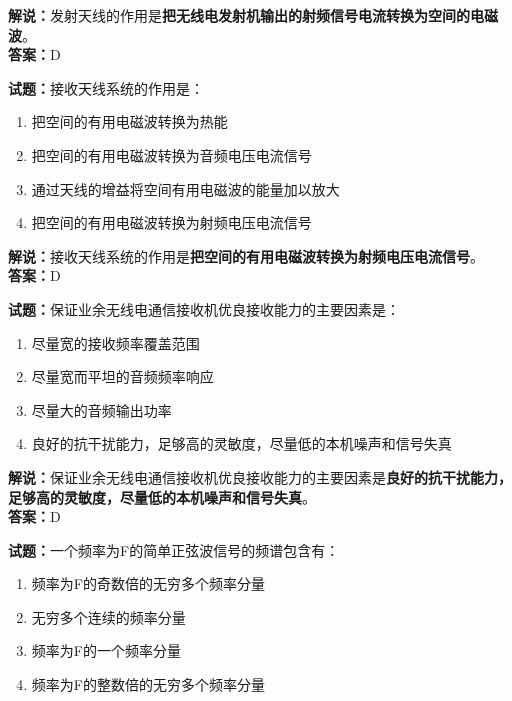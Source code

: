 \documentclass{ctexbook}
\begin{document}
\noindent\textbf{解说：}发射天线的作用是\textbf{把无线电发射机输出的射频信号电流转换为空间的电磁波}。\\
\noindent\textbf{答案：}D


\bigskip


\noindent\textbf{试题：}接收天线系统的作用是：

\begin{enumerate}[leftmargin=3em]
	\item 把空间的有用电磁波转换为热能
	\item 把空间的有用电磁波转换为音频电压电流信号
	\item 通过天线的增益将空间有用电磁波的能量加以放大
	\item 把空间的有用电磁波转换为射频电压电流信号
\end{enumerate}

\noindent\textbf{解说：}接收天线系统的作用是\textbf{把空间的有用电磁波转换为射频电压电流信号}。\\\noindent\textbf{答案：}D%


\bigskip


\noindent\textbf{试题：}保证业余无线电通信接收机优良接收能力的主要因素是：

\begin{enumerate}[leftmargin=3em]
	\item 尽量宽的接收频率覆盖范围
	\item 尽量宽而平坦的音频频率响应
	\item 尽量大的音频输出功率
	\item 良好的抗干扰能力，足够高的灵敏度，尽量低的本机噪声和信号失真
\end{enumerate}

\noindent\textbf{解说：}保证业余无线电通信接收机优良接收能力的主要因素是\textbf{良好的抗干扰能力，足够高的灵敏度，尽量低的本机噪声和信号失真}。\\\noindent\textbf{答案：}D%


\bigskip


\noindent\textbf{试题：}一个频率为F的简单正弦波信号的频谱包含有：

\begin{enumerate}[leftmargin=3em]
	\item 频率为F的奇数倍的无穷多个频率分量
	\item 无穷多个连续的频率分量
	\item 频率为F的一个频率分量
	\item 频率为F的整数倍的无穷多个频率分量
\end{enumerate}
\end{document}
